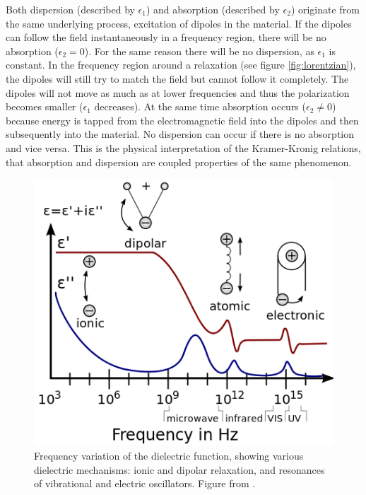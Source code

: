 Both dispersion (described by $\epsilon_1$) and absorption (described by $\epsilon_2$) originate from the same underlying process, excitation of dipoles in the material. If the dipoles can follow the field instantaneously in a frequency region, there will be no absorption ($\epsilon_2 = 0$). For the same reason there will be no dispersion, as $\epsilon_1$ is constant. In the frequency region around a relaxation (see figure \ref{fig:lorentzian}), the dipoles will still try to match the field but cannot follow it completely. The dipoles will not move as much as at lower frequencies and thus the polarization becomes smaller ($\epsilon_1$ decreases). At the same time absorption occurs ($\epsilon_2 \neq 0$) because energy is tapped from the electromagnetic field into the dipoles and then subsequently into the material. No dispersion can occur if there is no absorption and vice versa. This is the physical interpretation of the Kramer-Kronig relations, that absorption and dispersion are coupled properties of the same phenomenon\cite{hans_arwin}. 

\begin{figure}
    \centering 
    \includegraphics[scale=0.5]{figures/Ch2/DielectricResponses.png}
    \caption{Frequency variation of the dielectric function, showing various dielectric mechanisms: ionic and dipolar relaxation, and resonances of vibrational and electric oscillators. Figure from \cite{wiki_dielectricfunction}.}
    \label{fig:dielectricresponses}
\end{figure}


